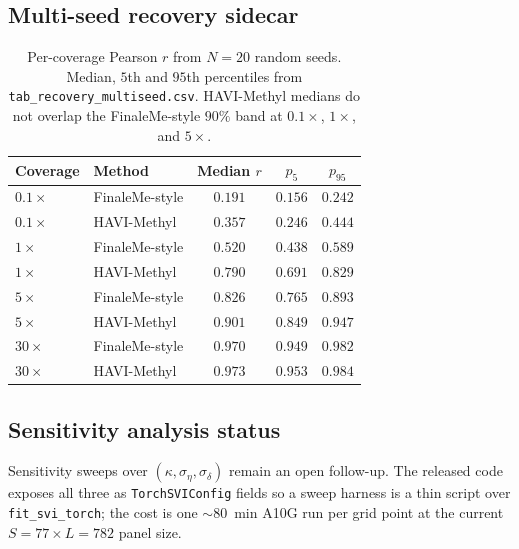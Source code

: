 \subsection*{Multi-seed recovery sidecar}
\begin{table}[htbp]
\centering\small
\caption{Per-coverage Pearson $r$ from $N=20$ random seeds. Median, $5$th and $95$th percentiles from \texttt{tab\_recovery\_multiseed.csv}. HAVI-Methyl medians do not overlap the FinaleMe-style $90\%$ band at $0.1\times$, $1\times$, and $5\times$.}
\label{tab:ext-multiseed}
\begin{tabular}{llccc}
\toprule
Coverage & Method & Median $r$ & $p_5$ & $p_{95}$ \\
\midrule
$0.1\times$ & FinaleMe-style & $0.191$ & $0.156$ & $0.242$ \\
$0.1\times$ & HAVI-Methyl    & $0.357$ & $0.246$ & $0.444$ \\
$1\times$   & FinaleMe-style & $0.520$ & $0.438$ & $0.589$ \\
$1\times$   & HAVI-Methyl    & $0.790$ & $0.691$ & $0.829$ \\
$5\times$   & FinaleMe-style & $0.826$ & $0.765$ & $0.893$ \\
$5\times$   & HAVI-Methyl    & $0.901$ & $0.849$ & $0.947$ \\
$30\times$  & FinaleMe-style & $0.970$ & $0.949$ & $0.982$ \\
$30\times$  & HAVI-Methyl    & $0.973$ & $0.953$ & $0.984$ \\
\bottomrule
\end{tabular}
\end{table}

\subsection*{Sensitivity analysis status}
Sensitivity sweeps over $(\kappa,\sigma_\eta,\sigma_\delta)$ remain an open follow-up. The released code exposes all three as \texttt{TorchSVIConfig} fields so a sweep harness is a thin script over \texttt{fit\_svi\_torch}; the cost is one $\sim$80~min A10G run per grid point at the current $S{=}77 \times L{=}782$ panel size.
